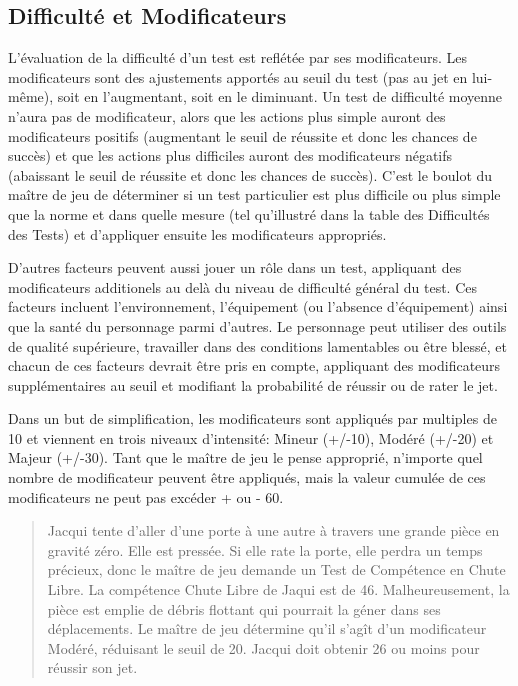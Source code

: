\subsection{Difficulté et Modificateurs} \label{sec:difficulty-modifiers} 

L'évaluation de la difficulté d'un test est reflétée par ses modificateurs. Les modificateurs sont des ajustements apportés au seuil du test (pas au jet en lui-même), soit en l'augmentant, soit en le diminuant. Un test de difficulté moyenne n'aura pas de modificateur, alors que les actions plus simple auront des modificateurs positifs (augmentant le seuil de réussite et donc les chances de succès) et que les actions plus difficiles auront des modificateurs négatifs (abaissant le seuil de réussite et donc les chances de succès). C'est le boulot du maître de jeu de déterminer si un test particulier est plus difficile ou plus simple que la norme et dans quelle mesure (tel qu'illustré dans la table des Difficultés des Tests) et d'appliquer ensuite les modificateurs appropriés. 

D'autres facteurs peuvent aussi jouer un rôle dans un test, appliquant des modificateurs additionels au delà du niveau de difficulté général du test. Ces facteurs incluent l'environnement, l'équipement (ou l'absence d'équipement) ainsi que la santé du personnage parmi d'autres. Le personnage peut utiliser des outils de qualité supérieure, travailler dans des conditions lamentables ou être blessé, et chacun de ces facteurs devrait être pris en compte, appliquant des modificateurs supplémentaires au seuil et modifiant la probabilité de réussir ou de rater le jet. 

Dans un but de simplification, les modificateurs sont appliqués par multiples de 10 et viennent en trois niveaux d'intensité: Mineur (+/-10), Modéré (+/-20) et Majeur (+/-30). Tant que le maître de jeu le pense approprié, n'importe quel nombre de modificateur peuvent être appliqués, mais la valeur cumulée de ces modificateurs ne peut pas excéder + ou - 60. 

\begin{quotation} Jacqui tente d'aller d'une porte à une autre à travers une grande pièce en gravité zéro. Elle est pressée. Si elle rate la porte, elle perdra un temps précieux, donc le maître de jeu demande un Test de Compétence en Chute Libre. La compétence Chute Libre de Jaqui est de 46. Malheureusement, la pièce est emplie de débris flottant qui pourrait la géner dans ses déplacements. Le maître de jeu détermine qu'il s'agît d'un modificateur Modéré, réduisant le seuil de 20. Jacqui doit obtenir 26 ou moins pour réussir son jet. \end{quotation} 

